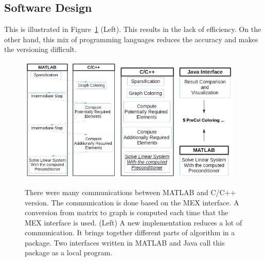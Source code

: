 \documentclass[11pt, twoside,a4paper]{book}
\begin{document}
\subsection{Software Design}
\label{s.software.design}
This is illustrated in Figure~\ref{f.structure} (Left).
This results in the lack of efficiency. On the other hand,
this mix of programming languages reduces
the accuracy and makes the versioning difficult.
\begin{figure}
\centering
\includegraphics[width=0.42\textwidth]{old_struct}
\hfill
\includegraphics[width=0.52\textwidth]{new_struct}
\caption{There were many communications between MATLAB and C/C++ version. The communication
is done based on the MEX interface. A conversion from matrix to graph is computed
each time that the MEX interface is used. (Left) A new implementation reduces a lot of communication.
It brings together different parts of algorithm in a package. Two interfaces written
in MATLAB and Java call this package as a local program.}
\label{f.structure}
\end{figure}
\end{document}
